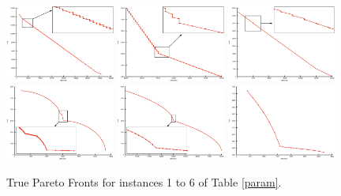 \documentclass{llncs}
\begin{document}
\begin{figure}[bt]
  \centering
      \includegraphics[width=0.32\textwidth]{1+zoom} \hfill
      \includegraphics[width=0.32\textwidth]{4+zoom} \hfill
      \includegraphics[width=0.32\textwidth]{9+zoom}\\
      \includegraphics[width=0.32\textwidth]{6+zoom} \hfill
      \includegraphics[width=0.32\textwidth]{8+zoom} \hfill
      \includegraphics[width=0.32\textwidth]{7}
\caption{\label{fig:ParetoFronts}True Pareto Fronts for instances 1 to 6 of Table \ref{param}.}
\end{figure}
\end{document}
